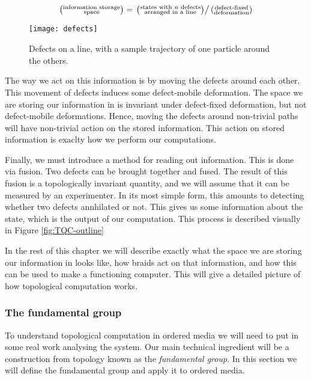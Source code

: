 \begin{equation*}
\left(\substack{
\text{information storage} \\ \text{space}}\right)
=
\left.\left(\substack{
\text{states with $n$ defects} \\ \text{arranged in a line}}\right)\right/
\left(\substack{
\text{defect-fixed} \\ \text{deformation}}\right)
\end{equation*}

\begin{figure}
\begin{center}
\texttt{[image: defects]}
\caption{Defects on a line, with a sample trajectory of one particle around the others.}
\label{fig:defects}
\end{center}
\end{figure}

The way we act on this information is by moving the defects around each other. This movement of defects induces some defect-mobile deformation. The space we are storing our information in is invariant under defect-fixed deformation, but not defect-mobile deformations. Hence, moving the defects around non-trivial paths will have non-trivial action on the stored information. This action on stored information is exaclty how we perform our computations.

Finally, we must introduce a method for reading out information. This is done via fusion. Two defects can be brought together and fused. The result of this fusion is a topologically invariant quantity, and we will assume that it can be measured by an experimenter. In its most simple form, this amounts to detecting whether two defects annhilated or not.  This gives us some information about the state, which is the output of our computation. This process is described visually in Figure \ref{fig:TQC-outline}

In the rest of this chapter we will describe exactly what the space we are storing our information in looks like, how braids act on that information, and how this can be used to make a functioning computer. This will give a detailed picture of how topological computation works.

\subsubsection{The fundamental group}

To understand topological computation in ordered media we will need to put in some real work analysing the system. Our main technical ingredient will be a construction from topology known as the \textit{fundamental group}. In this section we will define the fundamental group and apply it to ordered media.

